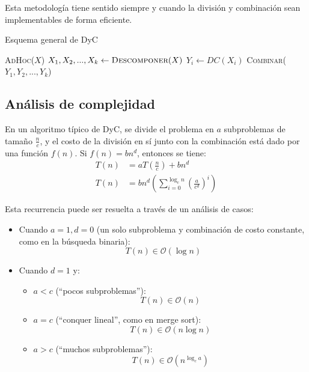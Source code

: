 \documentclass{article}
\newcommand{\BigO}[1]{{\mathcal{O}(#1)}}
\begin{document}
Esta metodología tiene sentido siempre y cuando la división y combinación sean implementables de forma eficiente.
\begin{algorithm}[H]
    \caption*{Esquema general de DyC}
    \begin{algorithmic}
         
            \State \Return \textsc{AdHoc}($X$) 
        \Else {}
            \State $X_1, X_2, ..., X_k \gets \textsc{Descomponer}(X)$
            \State $Y_i \gets DC(X_i)$
            \EndFor
            \State \Return \textsc{Combinar}($Y_1, Y_2, ..., Y_k$)
        \EndIf
        \EndFunction
    \end{algorithmic}
\end{algorithm}

\subsection{Análisis de complejidad}

En un algoritmo típico de DyC, se divide el problema en $a$ subproblemas de tamaño $\frac{n}{c}$, y el costo de la división en sí junto con la combinación está dado por una función $f(n)$. Si $f(n) = bn^d$, entonces se tiene:
\begin{align*}
    T(n) & = aT\left(\frac{n}{c}\right) + bn^d \\
    T(n) & = bn^d \left(\sum_{i=0}^{\log_c{n}} \left(\frac{a}{c^d}\right)^i\right)
\end{align*}

Esta recurrencia puede ser resuelta a través de un análisis de casos:
\begin{itemize}
    \item Cuando $a = 1, d = 0$ (un solo subproblema y combinación de costo constante, como en la búsqueda binaria):
        $$T(n) \in \BigO{\log{n}}$$
    \item Cuando $d = 1$ y:
     \begin{itemize}
        \item $a < c$ (``pocos subproblemas''):
            $$T(n) \in \BigO{n}$$
        \item $a = c$ (``conquer lineal'', como en merge sort):
            $$T(n) \in \BigO{n\log{n}}$$
        \item $a > c$ (``muchos subproblemas''):
            $$T(n) \in \BigO{n^{\log_c{a}}}$$
     \end{itemize}
\end{itemize}
\end{document}
